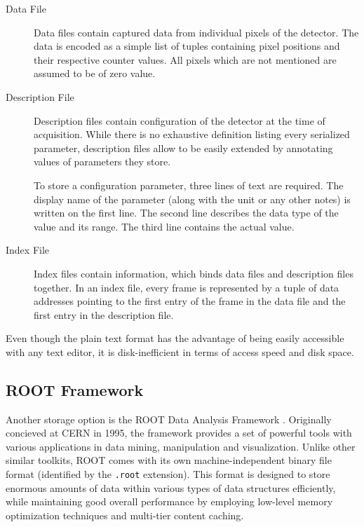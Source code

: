 \begin{description}
	\item[Data File]
	Data files contain captured data from individual pixels of the detector. The data is encoded as a simple list of tuples containing pixel positions and their respective counter values. All pixels which are not mentioned are assumed to be of zero value.

	\item[Description File]
	Description files contain configuration of the detector at the time of acquisition. While there is no exhaustive definition listing every serialized parameter, description files allow to be easily extended by annotating values of parameters they store.

	To store a configuration parameter, three lines of text are required. The display name of the parameter (along with the unit or any other notes) is written on the first line. The second line describes the data type of the value and its range. The third line contains the actual value.

	\item[Index File]
	Index files contain information, which binds data files and description files together. In an index file, every frame is represented by a tuple of data addresses pointing to the first entry of the frame in the data file and the first entry in the description file.
\end{description}

Even though the plain text format has the advantage of being easily accessible with any text editor, it is disk-inefficient in terms of access speed and disk space.

\subsection{ROOT Framework}
\label{storage:ROOT}
Another storage option is the ROOT Data Analysis Framework \cite{Brun199781}. Originally concieved at CERN in 1995, the framework provides a set of powerful tools with various applications in data mining, manipulation and visualization. Unlike other similar toolkits, ROOT comes with its own machine-independent binary file format (identified by the \texttt{.root} extension). This format is designed to store enormous amounts of data within various types of data structures efficiently, while maintaining good overall performance by employing low-level memory optimization techniques and multi-tier content caching.


